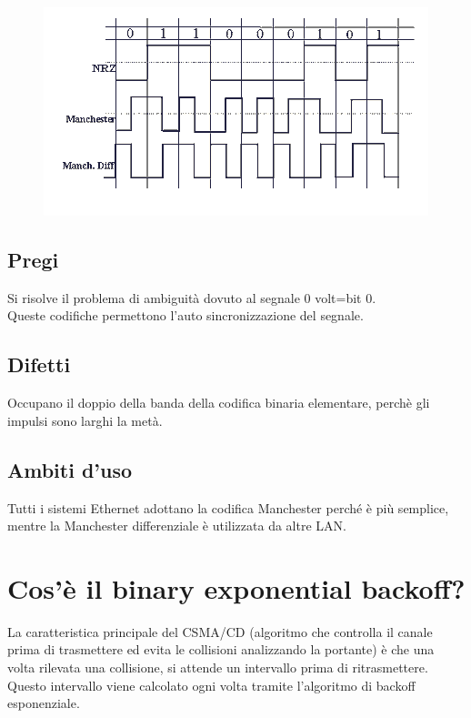 \begin{figure}[H]
\centering
\includegraphics[scale=0.8]{res/img/28_CodificaManchester.png}
\end{figure}

\subsection{Pregi}
Si risolve il problema di ambiguità dovuto al segnale 0 volt=bit 0.\\
Queste codifiche permettono l'auto sincronizzazione del segnale.

\subsection{Difetti}
Occupano il doppio della banda della codifica binaria elementare, perchè gli impulsi sono larghi la metà.

\subsection{Ambiti d'uso}
Tutti i sistemi Ethernet adottano la codifica Manchester perché è più semplice, mentre la Manchester differenziale è utilizzata da altre LAN.

\section{Cos’è il binary exponential backoff?}
La caratteristica principale del CSMA/CD (algoritmo che controlla il canale prima di trasmettere ed evita le collisioni analizzando la portante) è che una volta rilevata una collisione, si attende un intervallo prima di ritrasmettere. Questo intervallo viene calcolato ogni volta tramite l’algoritmo di backoff esponenziale.

